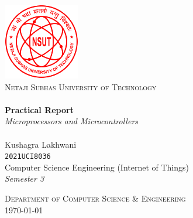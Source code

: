 \begin{titlepage}
    \begin{center}

        \includegraphics[width=0.25\textwidth]{res/NSUT.png}~\\[0.5cm]
        \textsc{\Large Netaji Subhas University of Technology}\\[2cm]

        \HRule \\[0.4cm]
        {
        \LARGE
        \textbf{Practical Report}\\[0.4cm]
        \emph{Microprocessors and Microcontrollers}\\[0.4cm]
        }
        \HRule \\[1.5cm]



        { \large
        Kushagra Lakhwani \\[0.1cm]
        \texttt{2021UCI8036}\\[0.5cm]
        Computer Science Engineering (Internet of Things)\\[0.1cm]
        \textit{Semester 3} \\[0.1cm]
        }

        \vfill

        \textsc{\large Department of Computer Science \& Engineering}\\[0.4cm]


        {\large \today}

    \end{center}
\end{titlepage}